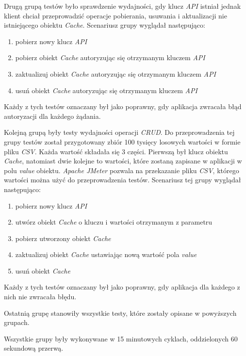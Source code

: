 Drugą grupą testów było sprawdzenie wydajności, gdy klucz \textsl{API} istniał jednak klient chciał przeprowadzić operacje pobierania, usuwania i aktualizacji nie istniejącego obiektu \textsl{Cache}. Scenariusz grupy wyglądał następująco:
\begin{enumerate}
    \item pobierz nowy klucz \textsl{API}
    \item pobierz obiekt \textsl{Cache} autoryzując się otrzymanym kluczem \textsl{API}
    \item zaktualizuj obiekt \textsl{Cache} autoryzując się otrzymanym kluczem \textsl{API}
    \item usuń obiekt \textsl{Cache} autoryzując się otrzymanym kluczem \textsl{API}
\end{enumerate}
Każdy z tych testów oznaczany był jako poprawny, gdy aplikacja zwracała błąd autoryzacji dla każdego żądania.

Kolejną grupą były testy wydajności operacji \textsl{CRUD}. Do przeprowadzenia tej grupy testów został przygotowany zbiór 100 tysięcy losowych wartości w formie pliku \textsl{CSV}. Każda wartość składała się 3 części. Pierwszą był klucz obiektu \textsl{Cache}, natomiast dwie kolejne to wartości, które zostaną zapisane w aplikacji w polu \textsl{value} obiektu. \textsl{Apache JMeter} pozwala na przekazanie pliku \textsl{CSV}, którego wartości można użyć do przeprowadzenia testów. Scenariusz tej grupy wyglądał następująco:
\begin{enumerate}
    \item pobierz nowy klucz \textsl{API}
    \item utwórz obiekt \textsl{Cache} o kluczu i wartości otrzymanym z parametru
    \item pobierz utworzony obiekt \textsl{Cache} 
    \item zaktualizuj obiekt \textsl{Cache} ustawiając nową wartość pola \textsl{value}
    \item usuń obiekt \textsl{Cache}
\end{enumerate}
Każdy z tych testów oznaczany był jako poprawny, gdy aplikacja dla każdego z nich nie zwracała błędu.

Ostatnią grupę stanowiły wszystkie testy, które zostały opisane w powyższych grupach. 

Wszystkie grupy były wykonywane w 15 minutowych cyklach, oddzielonych 60 sekundową przerwą.


